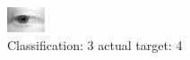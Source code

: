 \begin{figure}[h!]
\begin{center}
\includegraphics[width=0.60\columnwidth]{figures/ID2682_class_3_target_4.png}
\end{center}
\caption{ Classification: 3 actual target: 4}
\label{fig:ID2682_class_3_target_4}
\end{figure}
